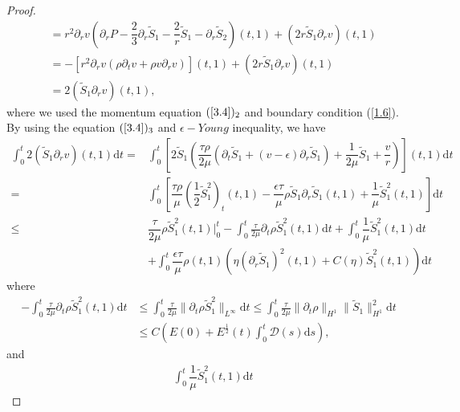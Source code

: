 \documentclass[10pt,reqno]{amsart}
\numberwithin{equation}{section}
\begin{document}
\begin{proof}
\begin{equation}
\begin{aligned}
				&= r^2\partial_r v (\partial_r P - \dfrac{2}{3}\partial_r \tilde{S}_1 - \dfrac{2}{r}\tilde{S}_1 - \partial_r \tilde{S}_2 )(t,1) + (2r\tilde{S}_1 \partial_r v) (t,1) \\
				&= -[r^2\partial_r v\left( \rho\partial_t v + \rho v\partial_r v \right)](t,1)+ (2r\tilde{S}_1 \partial_r v) (t,1) \\
				&=  2(\tilde{S}_1 \partial_r v) (t,1),
			\end{aligned}
		\end{equation}
		where we used the momentum equation $(\ref{3.4})_2$ and boundary condition (\ref{1.6}).
		By using the equation $(\ref{3.4})_3$ and $\epsilon-Young$ inequality, we have 
		\begin{equation}\nonumber
			\begin{aligned}
				\int_{0}^{t}2(\tilde{S}_1 \partial_r v )(t,1) \mathrm{d}t
				=&\int_{0}^{t}\left[2\tilde{S}_1\left(\dfrac{\tau  \rho}{2\mu}(\partial_t\tilde{S}_1+(v-\epsilon)\partial_r\tilde{S}_1)+\dfrac{1}{2\mu}\tilde{S}_1+\dfrac{v}{r}\right)\right](t,1)\mathrm{d}t\\
				=&\int_{0}^{t}\left[\dfrac{\tau \rho}{\mu}(\dfrac{1}{2}\tilde{S}_1^2)_t(t,1)
				-\dfrac{\epsilon\tau }{\mu} \rho \tilde{S}_1\partial_r\tilde{S}_1(t,1)
				+\dfrac{1}{\mu}\tilde{S}_1^2(t,1)\right]\mathrm{d}t\\
				\leq& \dfrac{\tau}{2\mu} \rho\tilde{S}_1^2(t,1)\big|_0^t
				-\int_{0}^{t}\frac{\tau}{2\mu}\partial_{t}\rho\tilde{S}_1^2(t,1)\mathrm{d}t
				+\int_{0}^{t}\dfrac{1}{\mu}\tilde{S}_1^2(t,1)\mathrm{d}t\\
				&+\int_{0}^{t}\dfrac{\epsilon\tau }{\mu}\rho(t,1)\left(\eta(\partial_{r}\tilde{S}_1)^2(t,1)+C(\eta)\tilde{S}_1^2(t,1)\right)\mathrm{d}t
			\end{aligned}
		\end{equation}
		where
		$$
		\begin{aligned}
			-\int_{0}^{t}\frac{\tau}{2\mu}\partial_{t}\rho\tilde{S}_1^2(t,1)\mathrm{d}t
			&\leq
			\int_{0}^{t}\frac{\tau}{2\mu}\|\partial_{t}\rho\tilde{S}_1^2\|_{L^{\infty}}\mathrm{d}t
			\leq \int_{0}^{t}\frac{\tau}{2\mu}\|\partial_{t}\rho\|_{H^{1}}\|\tilde{S}_1\|_{H^{1}}^2\mathrm{d}t\\
			&\leq C\left(E(0)+ E^{\frac{1}{2}}(t)\int_{0}^{t} \mathcal{D}(s)\mathrm{d}s\right),
		\end{aligned}
		$$
		and
		\begin{equation}
			\begin{aligned}\nonumber
				&\int_{0}^{t}\dfrac{1}{\mu} \tilde{S}_1^2(t,1)\mathrm{d}t

\end{aligned}
\end{equation}
\end{proof}
\end{document}
